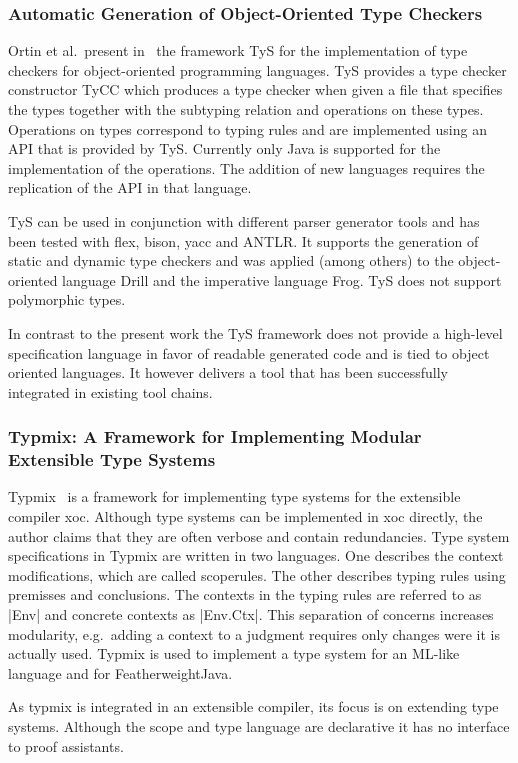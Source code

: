 \subsubsection{Automatic Generation of Object-Oriented Type Checkers}
Ortin et al.\ present in~\cite{ortin2014automatic} the framework TyS
for the implementation of type checkers for object-oriented
programming languages. TyS provides a type checker constructor TyCC
which produces a type checker when given a file that specifies the
types together with the subtyping relation and operations on these
types. Operations on types correspond to typing rules and are
implemented using an API that is provided by TyS. Currently only Java
is supported for the implementation of the operations. The addition of
new languages requires the replication of the API in that language.

TyS can be used in conjunction with different parser generator tools
and has been tested with flex, bison, yacc and ANTLR. It supports
the generation of static and dynamic type checkers and was applied
(among others) to the object-oriented language Drill and the
imperative language Frog. TyS does not support polymorphic types.

In contrast to the present work the TyS framework does not provide a
high-level specification language in favor of readable generated code
and is tied to object oriented languages. It however delivers a tool
that has been successfully integrated in existing tool chains.
\subsubsection{Typmix: A Framework for Implementing Modular Extensible Type
  Systems}
Typmix~\cite{bergan2007typmix} is a framework for implementing type
systems for the extensible compiler xoc. Although type systems can be
implemented in xoc directly, the author claims that they are often
verbose and contain redundancies. Type system specifications in Typmix
are written in two languages. One describes the context modifications,
which are called scoperules. The other describes typing rules using
premisses and conclusions. The contexts in the typing rules are
referred to as \code|Env| and concrete contexts as
\code|Env.Ctx|. This separation of concerns increases modularity,
e.g.\ adding a context to a judgment requires only changes were it is
actually used. Typmix is used to implement a type system for an
ML-like language and for FeatherweightJava.

As typmix is integrated in an extensible compiler, its focus is on
extending type systems. Although the scope and type language are
declarative it has no interface to proof assistants.

